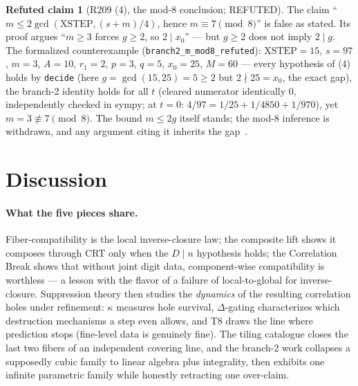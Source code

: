 \documentclass[11pt,a4paper]{article}
\theoremstyle{definition}
\newtheorem*{refutedclaim}{Refuted claim}
\begin{document}
\begin{refutedclaim}[R209 (4), the mod-$8$ conclusion; REFUTED]
  \label{ref:mod8}
  The claim ``$m\le2\gcd(\mathrm{XSTEP},(s+m)/4)$, hence
  $m\equiv7\pmod8$'' is false as stated. Its proof argues ``$m\ge3$
  forces $g\ge2$, so $2\mid x_0$'' --- but $g\ge2$ does not imply
  $2\mid g$. The formalized counterexample
  (\texttt{branch2\_m\_mod8\_refuted}): $\mathrm{XSTEP}=15$, $s=97$,
  $m=3$, $A=10$, $r_1=2$, $p=3$, $q=5$, $x_0=25$, $M=60$ --- every
  hypothesis of (4) holds by \texttt{decide} (here $g=\gcd(15,25)=5\ge
  2$ but $2\nmid25=x_0$, the exact gap), the branch-2 identity holds
  for all $t$ (cleared numerator identically $0$, independently checked
  in sympy; at $t=0$: $4/97=1/25+1/4850+1/970$), yet $m=3\not\equiv7
  \pmod8$. The bound $m\le2g$ itself stands; the mod-$8$ inference is
  withdrawn, and any argument citing it inherits the gap~\cite{D218}.
\end{refutedclaim}

\section{Discussion}

\paragraph{What the five pieces share.}
Fiber-compatibility is the local inverse-closure law; the composite
lift shows it composes through CRT only when the $D\mid n$ hypothesis
holds; the Correlation Break shows that without joint digit data,
component-wise compatibility is worthless --- a lesson with the flavor
of a failure of local-to-global for inverse-closure. Suppression theory
then studies the \emph{dynamics} of the resulting correlation holes
under refinement: $\kappa$ measures hole survival, $\Delta$-gating
characterizes which destruction mechanisms a step even allows, and T8
draws the line where prediction stops (fine-level data is genuinely
fine). The tiling catalogue closes the last two fibers of an independent
covering line, and the branch-2 work collapses a supposedly cubic family
to linear algebra plus integrality, then exhibits one infinite
parametric family while honestly retracting one over-claim.
\end{document}
